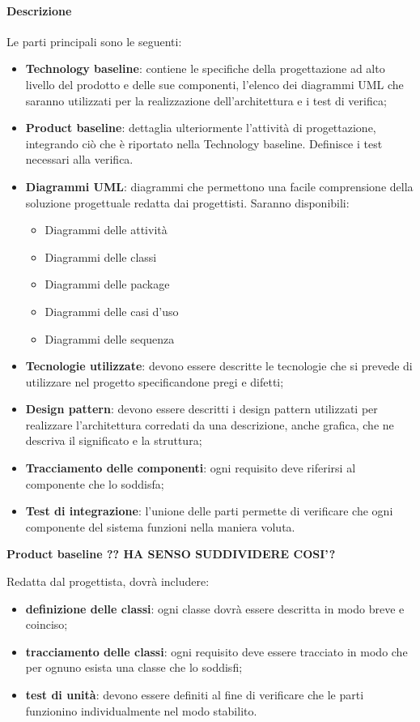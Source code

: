 \paragraph{Descrizione}
Le parti principali sono le seguenti:
\begin{itemize}
\item \textbf{Technology baseline}: contiene le specifiche della progettazione ad alto livello del prodotto e delle sue componenti, l'elenco dei diagrammi UML che saranno utilizzati per la realizzazione dell'architettura e i test di verifica;

\item \textbf{Product baseline}: dettaglia ulteriormente l'attività di progettazione,  integrando ciò che è riportato nella Technology baseline. Definisce i test necessari alla verifica.

\item \textbf{Diagrammi UML}: diagrammi che permettono una facile comprensione della soluzione progettuale redatta dai progettisti. Saranno disponibili:
\begin{itemize}
\item Diagrammi delle attività
\item Diagrammi delle classi
\item Diagrammi delle package
\item Diagrammi delle casi d'uso
\item Diagrammi delle sequenza
\end{itemize}
\item \textbf{Tecnologie utilizzate}: devono essere descritte le tecnologie che si prevede di utilizzare nel progetto specificandone pregi e difetti;
\item \textbf{Design pattern}: devono essere descritti i design pattern utilizzati per realizzare l'architettura corredati da una descrizione, anche grafica, che ne descriva il significato e la struttura;
\item \textbf{Tracciamento delle componenti}: ogni requisito deve riferirsi al componente che lo soddisfa;
\item \textbf{Test di integrazione}: l'unione delle parti permette di verificare che ogni componente del sistema funzioni nella maniera voluta.
\end{itemize}

\textbf{Product baseline ?? HA SENSO SUDDIVIDERE COSI'?}

Redatta dal progettista, dovrà includere:

\begin{itemize}
\item \textbf{definizione delle classi}: ogni classe dovrà essere descritta in modo breve e coinciso;
\item \textbf{tracciamento delle classi}: ogni requisito deve essere tracciato in modo che per ognuno esista una classe che lo soddisfi;
\item \textbf{test di unità}: devono essere definiti al fine di verificare che le parti funzionino individualmente nel modo stabilito.
\end{itemize}

